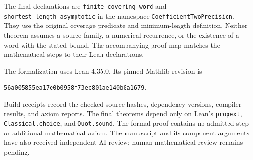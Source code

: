 \documentclass[11pt]{article}
\theoremstyle{definition}
\theoremstyle{remark}
\begin{document}
The final declarations are \texttt{finite\_covering\_word} and
\texttt{shortest\_length\_asymptotic} in the namespace
\texttt{CoefficientTwoPrecision}.
They use the original coverage predicate and minimum-length definition.
Neither theorem assumes a source family, a numerical recurrence, or the
existence of a word with the stated bound. The accompanying proof map
matches the mathematical steps to their Lean declarations.

The formalization uses Lean 4.35.0. Its pinned Mathlib revision is
\begin{center}
\texttt{56a005855ea17e0b0958f73ec801ae140b0a1679}.
\end{center}
Build receipts record the checked source hashes, dependency versions,
compiler results, and axiom reports. The final theorems depend only on
Lean's \texttt{propext}, \texttt{Classical.choice}, and \texttt{Quot.sound}.
The formal proof contains no admitted step or additional mathematical
axiom. The manuscript and its component arguments have also received
independent AI review; human mathematical review remains pending.

\begingroup
\raggedright


\endgroup
\end{document}
